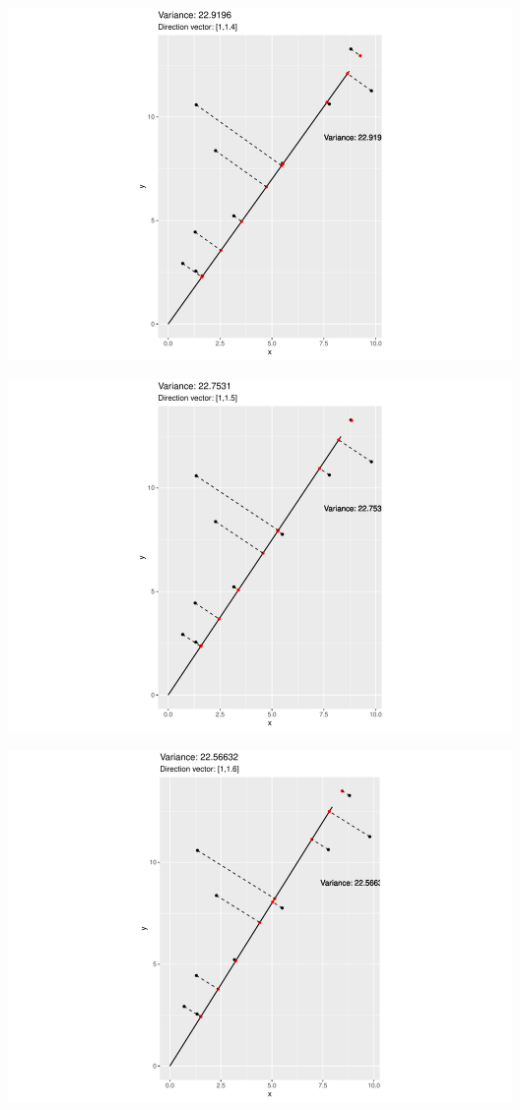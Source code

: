 \documentclass[
  ignorenonframetext,
]{beamer}
\begin{document}
\begin{frame}{}
\protect\hypertarget{section-14}{}
\includegraphics{note9_files/figure-beamer/unnamed-chunk-21-1.pdf}
\end{frame}

\begin{frame}{}
\protect\hypertarget{section-15}{}
\includegraphics{note9_files/figure-beamer/unnamed-chunk-22-1.pdf}
\end{frame}

\begin{frame}{}
\protect\hypertarget{section-16}{}
\includegraphics{note9_files/figure-beamer/unnamed-chunk-23-1.pdf}
\end{frame}
\end{document}
